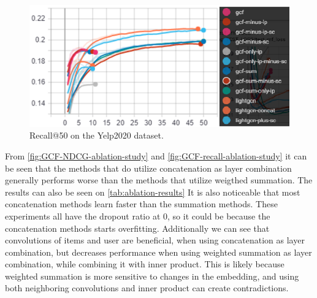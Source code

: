 \begin{figure}[h!]
    \includegraphics[width=\linewidth]{figures/gcf-all-recall.png}
    \caption{Recall@50 on the Yelp2020 dataset.}
    \label{fig:GCF-recall-ablation-study}
\end{figure}
From \autoref{fig:GCF-NDCG-ablation-study} and \autoref{fig:GCF-recall-ablation-study} it can be seen that the methods that do utilize concatenation as layer combination generally performs worse than the methods that utilize weigthed summation.
The results can also be seen on \autoref{tab:ablation-results}
It is also noticeable that most concatenation methods learn faster than the summation methods.
These experiments all have the dropout ratio at 0, so it could be because the concatenation methods starts overfitting.
Additionally we can see that convolutions of items and user are beneficial, when using concatenation as layer combination, but decreases performance when using weighted summation as layer combination, while combining it with inner product.
This is likely because weighted summation is more sensitive to changes in the embedding, and using both neighboring convolutions and inner product can create contradictions.
